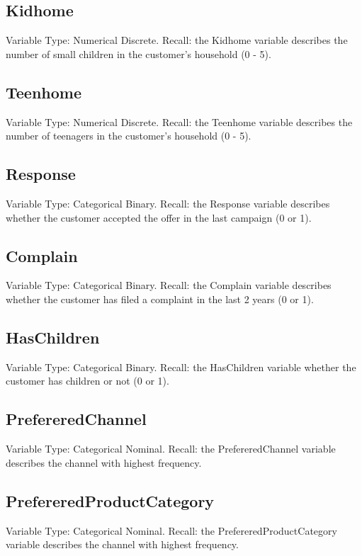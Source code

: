 \subsection{Kidhome}
Variable Type: Numerical Discrete.\newline
Recall: the Kidhome variable describes the number of small children in the customer's household (0 - 5).
\subsection{Teenhome}
Variable Type: Numerical Discrete.\newline
Recall: the Teenhome variable describes the number of teenagers in the customer's household (0 - 5).
\subsection{Response}
Variable Type: Categorical Binary.\newline
Recall: the Response variable describes whether the customer accepted the offer in the last campaign (0 or 1).
\subsection{Complain}
Variable Type: Categorical Binary.\newline
Recall: the Complain variable describes whether the customer has filed a complaint in the last 2 years (0 or 1).
\subsection{HasChildren}
Variable Type: Categorical Binary.\newline
Recall: the HasChildren variable  whether the customer has children or not (0 or 1).

\subsection{PrefereredChannel}
Variable Type: Categorical Nominal.\newline
Recall: the PrefereredChannel variable describes the channel with highest frequency.
\subsection{PrefereredProductCategory}
Variable Type: Categorical Nominal.\newline
Recall: the PrefereredProductCategory variable describes the channel with highest frequency.

